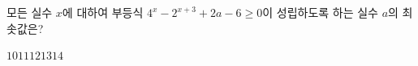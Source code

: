모든 실수 $x$에 대하여 부등식 $4^x-2^{x+3}+2a-6\ge 0$이 성립하도록 하는 실수 $a$의 최솟값은?
\begin{choices32}{$10$}{$11$}{$12$}{$13$}{$14$}\end{choices32}
